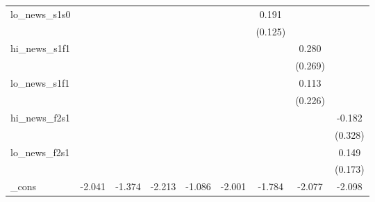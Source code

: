 {\begin{tabular}{l*{8}{c}}
\addlinespace
lo\_news\_s1s0&                     &                     &                     &                     &                     &       0.191         &                     &                     \\
            &                     &                     &                     &                     &                     &     (0.125)         &                     &                     \\
\addlinespace
hi\_news\_s1f1&                     &                     &                     &                     &                     &                     &       0.280         &                     \\
            &                     &                     &                     &                     &                     &                     &     (0.269)         &                     \\
\addlinespace
lo\_news\_s1f1&                     &                     &                     &                     &                     &                     &       0.113         &                     \\
            &                     &                     &                     &                     &                     &                     &     (0.226)         &                     \\
\addlinespace
hi\_news\_f2s1&                     &                     &                     &                     &                     &                     &                     &      -0.182         \\
            &                     &                     &                     &                     &                     &                     &                     &     (0.328)         \\
\addlinespace
lo\_news\_f2s1&                     &                     &                     &                     &                     &                     &                     &       0.149         \\
            &                     &                     &                     &                     &                     &                     &                     &     (0.173)         \\
\addlinespace
\_cons      &      -2.041\sym{**} &      -1.374\sym{**} &      -2.213\sym{***}&      -1.086         &      -2.001\sym{***}&      -1.784\sym{***}&      -2.077\sym{***}&      -2.098\sym{***}\\

\end{tabular}}
